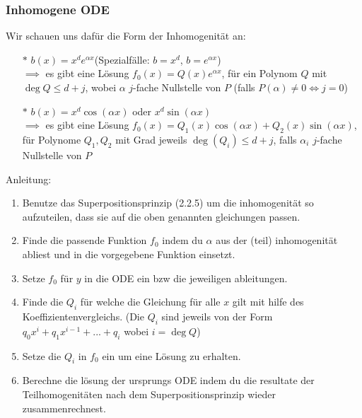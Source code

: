   \subsubsection{Inhomogene ODE}
    Wir schauen uns dafür die Form der Inhomogenität an:
    \begin{enumerate}
      \item[$*$] $b(x)=x^de^{\alpha x}$\hfill (Spezialfälle: $b=x^d$, 
        $b=e^{\alpha x}$)\\
        $\implies$ es gibt eine Lösung $f_0(x)=Q(x)e^{\alpha x}$, für ein
        Polynom $Q$ mit $\deg Q\leq d+j$, wobei $\alpha$ $j$-fache Nullstelle von
        $P$ (falls $P(\alpha)\neq0 \iff j=0$)
      \item[$*$] $b(x)=x^d\cos(\alpha x)$ oder $x^d\sin(\alpha x)$\\
        $\implies$ es gibt eine Lösung $f_0(x)=Q_1(x)\cos(\alpha
        x)+Q_2(x)\sin(\alpha x)$, für Polynome $Q_1,Q_2$ mit Grad jeweils
        $\deg(Q_i) \leq d+j$, falls $\alpha_i$ $j$-fache Nullstelle von $P$
    \end{enumerate}
    Anleitung:
    \begin{enumerate}
      \item Benutze das Superpositionsprinzip (2.2.5) um die inhomogenität so 
        aufzuteilen, dass sie auf die oben genannten gleichungen passen.
      \item Finde die passende Funktion $f_0$ indem du $\alpha$ aus der (teil) inhomogenität
        abliest und in die vorgegebene Funktion einsetzt.
      \item Setze $f_0$ für $y$ in die ODE ein bzw die jeweiligen ableitungen.
      \item Finde die $Q_i$ für welche die Gleichung für alle $x$ gilt mit hilfe
        des Koeffizientenvergleichs.
            (Die $Q_i$ sind jeweils von der Form
        $q_0x^{i}+q_1x^{i-1}+...+q_i$ wobei $i=\deg Q$)
      \item Setze die $Q_i$ in $f_0$ ein um eine Lösung zu erhalten.
      \item Berechne die lösung der ursprungs ODE indem du die resultate der
        Teilhomogenitäten nach dem Superpositionsprinzip wieder
        zusammenrechnest.
    \end{enumerate}
